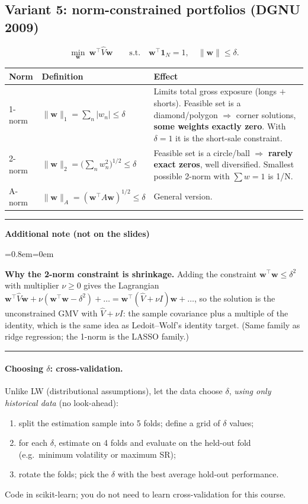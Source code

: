 \documentclass[11pt,a4paper]{report}
\newenvironment{notebox}[1]
  {\par\medskip\Needspace{6\baselineskip}\noindent\rule{\linewidth}{0.4pt}\par\nopagebreak
   \noindent\textbf{#1}\par\nopagebreak
   \begin{list}{}{\leftmargin=0.8em\rightmargin=0em\topsep=2pt}\item[]}
  {\end{list}\nopagebreak\noindent\rule{\linewidth}{0.4pt}\par\medskip}
\newenvironment{addnote}{\begin{notebox}{Additional note (not on the slides)}}{\end{notebox}}
\newcommand{\one}{\mathbf{1}_N}
\newcommand{\w}{\bm{w}}
\newcommand{\T}{^{\top}}
\begin{document}
\subsection{Variant 5: norm-constrained portfolios (DGNU 2009)}
\[
\min_{\w}\ \w\T\hat V\w\qquad\text{s.t.}\quad\w\T\one=1,\quad\|\w\|\le\delta .
\]
\begin{center}
\begin{tabularx}{\textwidth}{@{}lXX@{}}
\toprule
Norm & Definition & Effect \\
\midrule
1-norm & $\|\w\|_1=\sum_n|w_n|\le\delta$ & Limits total gross exposure (longs $+$ shorts). Feasible set is a diamond/polygon $\Rightarrow$ corner solutions, \textbf{some weights exactly zero}. With $\delta=1$ it is the short-sale constraint. \\
2-norm & $\|\w\|_2=\big(\sum_n w_n^2\big)^{1/2}\le\delta$ & Feasible set is a circle/ball $\Rightarrow$ \textbf{rarely exact zeros}, well diversified. Smallest possible 2-norm with $\sum w=1$ is 1/N. \\
A-norm & $\|\w\|_A=(\w\T A\w)^{1/2}\le\delta$ & General version. \\
\bottomrule
\end{tabularx}
\end{center}
\begin{addnote}
\textbf{Why the 2-norm constraint is shrinkage.} Adding the constraint
$\w\T\w\le\delta^2$ with multiplier $\nu\ge0$ gives the Lagrangian
$\w\T\hat V\w+\nu(\w\T\w-\delta^2)+\dots=\w\T(\hat V+\nu I)\w+\dots$, so the
solution is the unconstrained GMV with $\hat V+\nu I$: the sample covariance plus a
multiple of the identity, which is the same idea as Ledoit--Wolf's identity target.
(Same family as ridge regression; the 1-norm is the LASSO family.)
\end{addnote}

\paragraph{Choosing $\delta$: cross-validation.} Unlike LW (distributional
assumptions), let the data choose $\delta$, \emph{using only historical data}
(no look-ahead):
\begin{enumerate}
  \item split the estimation sample into 5 folds; define a grid of $\delta$ values;
  \item for each $\delta$, estimate on 4 folds and evaluate on the held-out fold
    (e.g.\ minimum volatility or maximum SR);
  \item rotate the folds; pick the $\delta$ with the best average hold-out performance.
\end{enumerate}
Code in scikit-learn; you do not need to learn cross-validation for this course.
\end{document}
